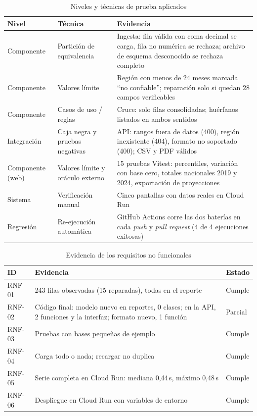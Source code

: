 \documentclass[conference]{IEEEtran}
\begin{document}
\begin{table}[t]
\caption{Niveles y técnicas de prueba aplicados}\label{tab:pruebas}
\centering
\begin{tabular}{@{}p{1.6cm}p{2.4cm}p{3.6cm}@{}}
\toprule
Nivel & Técnica & Evidencia \\
\midrule
Componente & Partición de equivalencia & Ingesta: fila válida con coma decimal se carga, fila no numérica se rechaza; archivo de esquema desconocido se rechaza completo \\
Componente & Valores límite & Región con menos de 24 meses marcada ``no confiable''; reparación solo si quedan 28 campos verificables \\
Componente & Casos de uso / reglas & Cruce: solo filas consolidadas; huérfanos listados en ambos sentidos \\
Integración & Caja negra y pruebas negativas & API: rangos fuera de datos (400), región inexistente (404), formato no soportado (400); CSV y PDF válidos \\
Componente (web) & Valores límite y oráculo externo & 15 pruebas Vitest: percentiles, variación con base cero, totales nacionales 2019 y 2024, exportación de proyecciones \\
Sistema & Verificación manual & Cinco pantallas con datos reales en Cloud Run \\
Regresión & Re-ejecución automática & GitHub Actions corre las dos baterías en cada \textit{push} y \textit{pull request} (4 de 4 ejecuciones exitosas) \\
\bottomrule
\end{tabular}
\end{table}

\begin{table}[t]
\caption{Evidencia de los requisitos no funcionales}\label{tab:evidencia}
\centering
\begin{tabular}{@{}lp{4.6cm}l@{}}
\toprule
ID & Evidencia & Estado \\
\midrule
RNF-01 & 243 filas observadas (15 reparadas), todas en el reporte & Cumple \\
RNF-02 & Código final: modelo nuevo en reportes, 0 clases; en la API, 2 funciones y la interfaz; formato nuevo, 1 función & Parcial \\
RNF-03 & Pruebas con bases pequeñas de ejemplo & Cumple \\
RNF-04 & Carga todo o nada; recargar no duplica & Cumple \\
RNF-05 & Serie completa en Cloud Run: mediana 0,44\,s, máximo 0,48\,s & Cumple \\
RNF-06 & Despliegue en Cloud Run con variables de entorno & Cumple \\
\bottomrule
\end{tabular}
\end{table}
\end{document}
